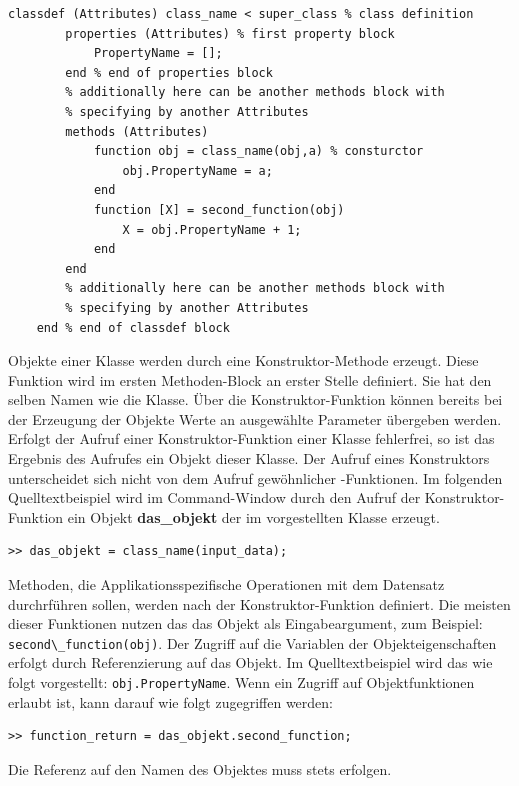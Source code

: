 \begin{lstlisting}[float=h!,caption={Beispiel Klassendefinition},label={Klassendefinition}, frame=none]
	classdef (Attributes) class_name < super_class % class definition
		properties (Attributes) % first property block
			PropertyName = [];
		end % end of properties block
		% additionally here can be another methods block with 
		% specifying by another Attributes
		methods (Attributes) 
			function obj = class_name(obj,a) % consturctor
				obj.PropertyName = a;
			end
			function [X] = second_function(obj)
				X = obj.PropertyName + 1;
			end
		end
		% additionally here can be another methods block with 
		% specifying by another Attributes
	end % end of classdef block
\end{lstlisting}

Objekte einer Klasse werden durch eine Konstruktor-Methode erzeugt. Diese
Funktion wird im ersten Methoden-Block an erster Stelle definiert. Sie hat den
selben Namen wie die Klasse. \"Uber die Konstruktor-Funktion k\"onnen bereits
bei der Erzeugung der Objekte Werte an ausgew\"ahlte Parameter \"ubergeben
werden. Erfolgt der Aufruf einer Konstruktor-Funktion einer Klasse fehlerfrei,
so ist das Ergebnis des Aufrufes ein Objekt dieser Klasse. Der Aufruf eines
Konstruktors unterscheidet sich nicht von dem Aufruf gew\"ohnlicher
\matlab-Funktionen. Im folgenden Quelltextbeispiel wird im Command-Window durch
den Aufruf der Konstruktor-Funktion ein Objekt \textbf{das\_objekt} der im
 vorgestellten Klasse erzeugt.
\begin{lstlisting}[frame=none]
	>> das_objekt = class_name(input_data);
\end{lstlisting}

Methoden, die Applikationsspezifische Operationen mit dem Datensatz
durchrf\"uhren sollen, werden nach der Konstruktor-Funktion definiert.
Die meisten dieser Funktionen nutzen das das Objekt als Eingabeargument, zum
Beispiel: \lstinline{second\_function(obj)}. Der Zugriff auf die Variablen der
Objekteigenschaften erfolgt durch Referenzierung auf das Objekt. Im
Quelltextbeispiel  wird das wie folgt vorgestellt:
\lstinline{obj.PropertyName}. Wenn ein Zugriff auf Objektfunktionen erlaubt ist,
kann darauf wie folgt zugegriffen werden:

\begin{lstlisting}[frame=none]
	>> function_return = das_objekt.second_function;
\end{lstlisting}
\noindent Die Referenz auf den Namen des Objektes muss stets erfolgen.


